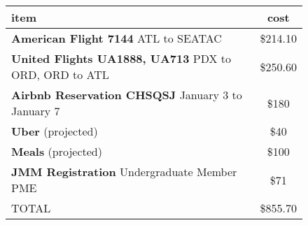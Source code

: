\documentclass{scrartcl}
\begin{document}
\begin{figure}[h]
\begin{tabular}{ |p{}|c| } 
  \hline
  item 
    & cost \\
  \hline

  \textbf{American Flight 7144} \newline 
    ATL to SEATAC 
  & \$214.10  \\ 
  
  \textbf{United Flights UA1888, UA713} \newline 
    PDX to ORD, ORD to ATL
  & \$250.60  \\ 
 
  \textbf{Airbnb Reservation CHSQSJ} \newline 
    January 3 to January 7
  & \$180  \\
  
  \textbf{Uber} \newline
    (projected)
  & \$40 \\
  
  \textbf{Meals} \newline
    (projected)
  & \$100 \\
  
  \textbf{JMM Registration} \newline
    Undergraduate Member PME
  & \$71 \\
  \hline
  
  TOTAL &
    \$855.70 \\
  \hline
\end{tabular}
\end{figure}
\end{document}
